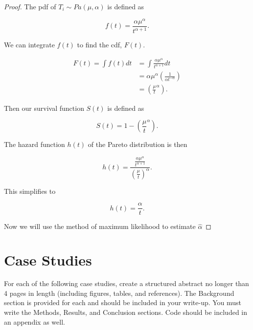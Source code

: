 \documentclass{article}
\begin{document}
	\begin{proof}
	The pdf of $T_i \sim Pa(\mu, \alpha)$ is defined as

	\[ f(t) = \frac{\alpha\mu^\alpha}{t^{\alpha + 1}}.\]

	We can integrate $f(t)$ to find the cdf, $F(t)$.

	\begin{align*}
		F(t) = \int f(t)dt & = \int\frac{\alpha\mu^\alpha}{t^{\alpha + 1}} dt \\
		& = \alpha\mu^\alpha \left( \frac{1}{\alpha t^{-\alpha}} \right) \\
		& = \left( \frac{\mu}{t}^\alpha \right).
	\end{align*}

	Then our survival function $S(t)$ is defined as

	\[S(t) = 1 - \left( \frac{\mu}{t}^\alpha \right).\]

	The hazard function $h(t)$ of the Pareto distribution is then
	
	\[h(t) = \frac{ \frac{\alpha\mu^\alpha}{t^{\alpha + 1}} }{ \left( \frac{\mu}{t}\right) ^\alpha } .\]

	This simplifies to

	\[ h(t) = \frac{\alpha}{t}.\]

	
	Now we will use the method of maximum likelihood to estimate $\hat{\alpha}$


	\end{proof}

	\newpage
	\section*{Case Studies}
	For each of the following case studies, create a structured abstract no longer than 4 pages in length (including figures, tables, and references). The Background section is provided for each and should be included in your write-up. You must write the Methods, Results, and Conclusion sections. Code should be included in an appendix as well.
\end{document}
